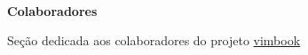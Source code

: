 
\begin{center}
\begin{Huge}~\\[10mm]\textbf{{Colaboradores}}\\[20mm]\end{Huge}
{}
\end{center}

Seção dedicada aos colaboradores do projeto \href{http://code.google.com/p/vimbook}{vimbook}



